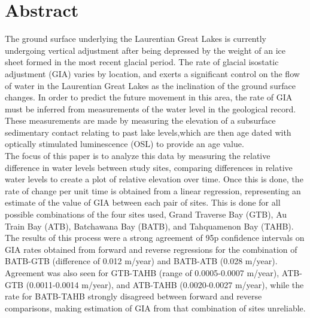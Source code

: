 \section{Abstract}
The ground surface underlying the Laurentian Great Lakes is currently undergoing vertical adjustment
 after being depressed by the weight of an ice sheet formed in the most recent glacial period.
 The rate of glacial isostatic adjustment (GIA) varies by location, and exerts a significant control on the flow of water
 in the Laurentian Great Lakes as the inclination of the ground surface changes. In order to predict the
 future movement in this area, the rate of GIA must be
 inferred from measurements of the water level in the geological record. These measurements are
 made by measuring the elevation of a subsurface sedimentary contact relating to
 past lake levels,which are then age dated with optically stimulated luminescence
 (OSL) to provide an age value.\\
 
 The focus of this paper is to analyze this data by measuring the relative difference in water levels
 between study sites, comparing differences in relative water levels to create a
 plot of relative elevation over time. Once this is done, the rate of change per unit
 time is obtained from a linear regression, representing an estimate of the value
 of GIA between each pair of sites. This is done for
 all possible combinations of the four sites used, 
 Grand Traverse Bay (GTB), Au Train Bay (ATB), Batchawana Bay (BATB), and Tahquamenon Bay (TAHB).\\
 
 The results of this process were a strong agreement of 95p confidence intervals on GIA rates obtained from
 forward and reverse regressions for the combination of BATB-GTB (difference of 0.012 m/year) and
 BATB-ATB (0.028 m/year). Agreement was also seen for GTB-TAHB (range of 0.0005-0.0007 m/year),
 ATB-GTB (0.0011-0.0014 m/year), and ATB-TAHB (0.0020-0.0027 m/year), while the rate for BATB-TAHB
 strongly disagreed between forward and reverse comparisons, making estimation of
 GIA from that combination of sites unreliable.
 
